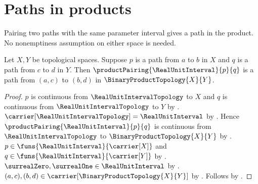 \section{Paths in products}




Pairing two paths with the same parameter interval gives a path in the
product. No nonemptiness assumption on either space is needed.

\begin{theorem}\label{product_pairing_of_paths}
    Let $X,Y$ be topological spaces.
    Suppose $p$ is a path from $a$ to $b$ in $X$ and
        $q$ is a path from $c$ to $d$ in $Y$.
    Then $\productPairing{\RealUnitInterval}{p}{q}$ is a path from
        $(a,c)$ to $(b,d)$ in $\BinaryProductTopology{X}{Y}$.
\end{theorem}
\begin{proof}
    $p$ is continuous from $\RealUnitIntervalTopology$ to $X$ and
        $q$ is continuous from $\RealUnitIntervalTopology$ to $Y$ by .
    $\carrier[\RealUnitIntervalTopology]=\RealUnitInterval$ by
        .
    Hence $\productPairing{\RealUnitInterval}{p}{q}$ is continuous from
        $\RealUnitIntervalTopology$ to $\BinaryProductTopology{X}{Y}$ by
        .
    $p\in\funs{\RealUnitInterval}{\carrier[X]}$ and
        $q\in\funs{\RealUnitInterval}{\carrier[Y]}$ by .
    $\surrealZero,\surrealOne\in\RealUnitInterval$ by
        .
    $(a,c),(b,d)\in\carrier[\BinaryProductTopology{X}{Y}]$ by
        .
    Follows by .
\end{proof}

